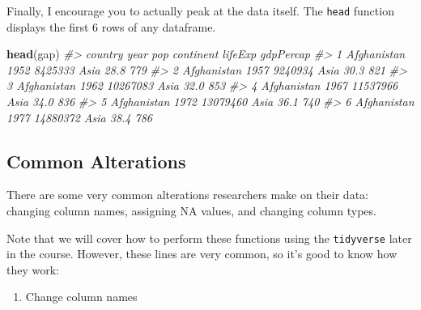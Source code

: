 \documentclass[]{book}
\newenvironment{Shaded}{\begin{snugshade}}{\end{snugshade}}
\newcommand{\KeywordTok}[1]{\textcolor[rgb]{0.13,0.29,0.53}{\textbf{#1}}}
\newcommand{\StringTok}[1]{\textcolor[rgb]{0.31,0.60,0.02}{#1}}
\newcommand{\CommentTok}[1]{\textcolor[rgb]{0.56,0.35,0.01}{\textit{#1}}}
\newcommand{\NormalTok}[1]{#1}
\providecommand{\tightlist}{%
  \setlength{\itemsep}{0pt}\setlength{\parskip}{0pt}}
\begin{document}
Finally, I encourage you to actually peak at the data itself. The
\texttt{head} function displays the first 6 rows of any dataframe.

\begin{Shaded}
\begin{Highlighting}[]
\KeywordTok{head}\NormalTok{(gap)}
\CommentTok{#>       country year      pop continent lifeExp gdpPercap}
\CommentTok{#> 1 Afghanistan 1952  8425333      Asia    28.8       779}
\CommentTok{#> 2 Afghanistan 1957  9240934      Asia    30.3       821}
\CommentTok{#> 3 Afghanistan 1962 10267083      Asia    32.0       853}
\CommentTok{#> 4 Afghanistan 1967 11537966      Asia    34.0       836}
\CommentTok{#> 5 Afghanistan 1972 13079460      Asia    36.1       740}
\CommentTok{#> 6 Afghanistan 1977 14880372      Asia    38.4       786}
\end{Highlighting}
\end{Shaded}

\subsection{Common Alterations}\label{common-alterations}

There are some very common alterations researchers make on their data:
changing column names, assigning NA values, and changing column types.

Note that we will cover how to perform these functions using the
\texttt{tidyverse} later in the course. However, these lines are very
common, so it's good to know how they work:

\begin{enumerate}
\def\labelenumi{\arabic{enumi}.}
\tightlist
\item
  Change column names
\end{enumerate}

\begin{Shaded}
\end{Shaded}
\end{document}
